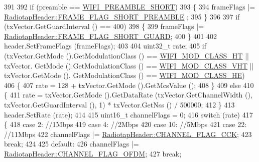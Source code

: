 \begin{DoxyCode}
391 
392         \textcolor{keywordflow}{if} (preamble == \hyperlink{group__wifi_gga5e94a56cb338a14ffbbb19c6a41251ebab9a39ca1f62d36c33ac489c4cf59745b}{WIFI\_PREAMBLE\_SHORT})
393           \{
394             frameFlags |= \hyperlink{classns3_1_1RadiotapHeader_a4375e57b5815a2ac2d6cfe4ca0c703d4a654ebb50af85aaaee342f7939782efd1}{RadiotapHeader::FRAME\_FLAG\_SHORT\_PREAMBLE}
      ;
395           \}
396 
397         \textcolor{keywordflow}{if} (txVector.GetGuardInterval () == 400)
398           \{
399             frameFlags |= \hyperlink{classns3_1_1RadiotapHeader_a4375e57b5815a2ac2d6cfe4ca0c703d4a6656cb9084d29627022e94f04a1f0e0c}{RadiotapHeader::FRAME\_FLAG\_SHORT\_GUARD};
400           \}
401 
402         header.SetFrameFlags (frameFlags);
403 
404         uint32\_t rate;
405         \textcolor{keywordflow}{if} (txVector.GetMode ().GetModulationClass () == \hyperlink{namespacens3_aa999e1221606a2b21b1eb33c2007c217a6ac45cac36cc4454649435d24ebf349c}{WIFI\_MOD\_CLASS\_HT} || txVector.
      GetMode ().GetModulationClass () == \hyperlink{namespacens3_aa999e1221606a2b21b1eb33c2007c217a9863e4342bf5c238c74dddfc4d96c67e}{WIFI\_MOD\_CLASS\_VHT} || txVector.GetMode ().
      GetModulationClass () == \hyperlink{namespacens3_aa999e1221606a2b21b1eb33c2007c217abfa4f7272510045a9b43e8ac27ac13b0}{WIFI\_MOD\_CLASS\_HE})
406           \{
407             rate = 128 + txVector.GetMode ().GetMcsValue ();
408           \}
409         \textcolor{keywordflow}{else}
410           \{
411             rate = txVector.GetMode ().GetDataRate (txVector.GetChannelWidth (), txVector.GetGuardInterval 
      (), 1) * txVector.GetNss () / 500000;
412           \}
413         header.SetRate (rate);
414 
415         uint16\_t channelFlags = 0;
416         \textcolor{keywordflow}{switch} (rate)
417           \{
418           \textcolor{keywordflow}{case} 2:  \textcolor{comment}{//1Mbps}
419           \textcolor{keywordflow}{case} 4:  \textcolor{comment}{//2Mbps}
420           \textcolor{keywordflow}{case} 10: \textcolor{comment}{//5Mbps}
421           \textcolor{keywordflow}{case} 22: \textcolor{comment}{//11Mbps}
422             channelFlags |= \hyperlink{classns3_1_1RadiotapHeader_a26df5fbb86499c692bd97a99781c8140a740fb537c6a0c4c743e3d597d99b7714}{RadiotapHeader::CHANNEL\_FLAG\_CCK};
423             \textcolor{keywordflow}{break};
424 
425           \textcolor{keywordflow}{default}:
426             channelFlags |= \hyperlink{classns3_1_1RadiotapHeader_a26df5fbb86499c692bd97a99781c8140a618a5705ee75fd8eea124cd36a6bfbba}{RadiotapHeader::CHANNEL\_FLAG\_OFDM};
427             \textcolor{keywordflow}{break};

\end{DoxyCode}
